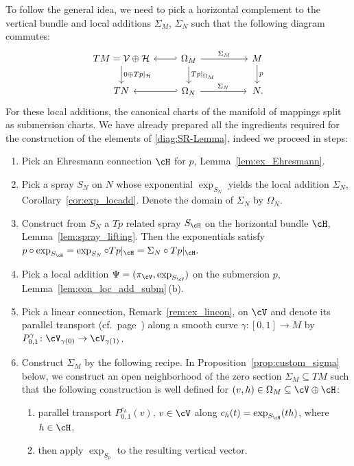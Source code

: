To follow the general idea, we need to pick a horizontal complement to the vertical bundle and local additions $\Sigma_M$, $\Sigma_N$ such that the following diagram commutes:
\begin{equation}\label{diag:SR-Lemma}
\begin{tikzcd}
 TM=\mathcal{V} \oplus \mathcal{H} \arrow[d, ,"0\oplus Tp|_{\mathcal{H}}"] & \arrow[l,hook'] \Omega_M \arrow[rr,"\Sigma_M"] \arrow[d,"Tp|_{\Omega_M}"] & &M \arrow[d,"p"]\\ TN & \arrow[l, hook'] \Omega_N \arrow[rr,"\Sigma_N"] & &\,N.
\end{tikzcd}
\end{equation}
For these local additions, the canonical charts of the manifold of mappings split as submersion charts.
We have already prepared all the ingredients required for the construction of the elements of \eqref{diag:SR-Lemma}, indeed we proceed in steps:
\begin{enumerate}\itemsep=0pt
\item Pick an Ehresmann connection $\cH$ for $p$, Lemma~\ref{lem:ex_Ehresmann}.
\item Pick a spray $S_N$ on $N$ whose exponential $\exp_{S_N}$ yields the local addition $\Sigma_N$, Corollary~\ref{cor:exp_locadd}. Denote the domain of $\Sigma_N$ by $\Omega_N$.
\item Construct from $S_N$ a $Tp$ related spray $S_\cH$ on the horizontal bundle $\cH$, Lemma~\ref{lem:spray_lifting}. Then the exponentials satisfy $p \circ \exp_{S_\cH} = \exp_{S_N} \circ Tp|_\cH = \Sigma_N \circ Tp|_{\cH}.$
\item Pick a local addition $\Psi=(\pi_{\cV},\exp_{S_{\cV}})$ on the submersion $p$, Lemma~\ref{lem:con_loc_add_subm}\,(b).
\item Pick a linear connection, Remark~\ref{rem:ex_lincon}, on $\cV$ and denote its parallel transport (cf.\ page~\pageref{setup:parallel_tp}) along a smooth curve $\gamma \colon [0,1] \rightarrow M$ by $P^\gamma_{0,1}\colon \cV_{\gamma(0)} \rightarrow \cV_{\gamma(1)}$.
\item Construct $\Sigma_M$ by the following recipe. In Proposition~\ref{prop:custom_sigma} below, we construct an open neighborhood of the zero section $\Sigma_M \subseteq TM$ such that the following construction is well defined for $(v,h) \in \Omega_M \subseteq \cV \oplus \cH$:
\begin{enumerate}\itemsep=0pt
\item parallel transport $P_{0,1}^{c_h}(v)$, $v\in \cV$ along $c_h(t)=\exp_{S_\cH}(th)$, where $h \in \cH$,
\item then apply $\exp_{S_p}$ to the resulting vertical vector.
\end{enumerate}
\end{enumerate}

